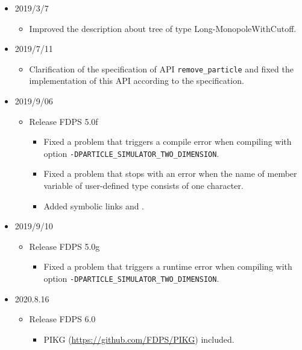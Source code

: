 \begin{itemize}[leftmargin=*,itemsep=-1ex]
\item 2019/3/7
\begin{itemize}
\item Improved the description about tree of type Long-MonopoleWithCutoff.
\end{itemize}

\item 2019/7/11
\begin{itemize}
\item Clarification of the specification of API \texttt{remove\_particle} and fixed the implementation of this API according to the specification.
\end{itemize}
 
 \item 2019/9/06
\begin{itemize}
\item Release FDPS 5.0f
\begin{itemize}
\item Fixed a problem that triggers a compile error when compiling with option \texttt{-DPARTICLE\_SIMULATOR\_TWO\_DIMENSION}.
\item Fixed a problem that  stops with an error when the name of member variable of user-defined type consists of one character.
\item Added symbolic links  and .
\end{itemize}
\end{itemize}

\item 2019/9/10
\begin{itemize}
\item Release FDPS 5.0g
\begin{itemize}
\item Fixed a problem that triggers a runtime error when compiling with option \texttt{-DPARTICLE\_SIMULATOR\_TWO\_DIMENSION}.
\end{itemize}
\end{itemize}

\item 2020.8.16
\begin{itemize}
\item Release FDPS 6.0
\begin{itemize}
\item PIKG (\url{https://github.com/FDPS/PIKG}) included.
\end{itemize}
\end{itemize}
    

\end{itemize}
